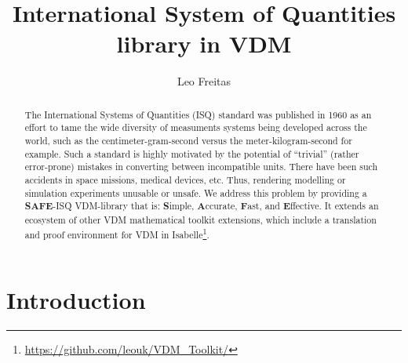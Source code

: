 \documentclass[runningheads,a4paper]{llncs}
\begin{document}
%



\title{International System of Quantities library in VDM}

\author{Leo Freitas
}
\authorrunning{ }

			
\maketitle
\setcounter{footnote}{0} 
\begin{abstract}
    The International Systems of Quantities (ISQ) standard was published in 1960 as an effort to tame the wide diversity of measuments systems being developed across the world, such as the centimeter-gram-second versus the meter-kilogram-second for example. Such a standard is highly motivated by the potential of ``trivial'' (rather error-prone) mistakes in converting between incompatible units. There have been such accidents in space missions, medical devices, etc. Thus, rendering modelling or simulation experiments unusable or unsafe. We address this problem by providing a \textbf{SAFE}-ISQ VDM-library that is: \textbf{S}imple, \textbf{A}ccurate, \textbf{F}ast, and \textbf{E}ffective. It extends an ecosystem of other VDM mathematical toolkit extensions, which include a translation and proof environment for VDM in Isabelle\footnote{\url{https://github.com/leouk/VDM_Toolkit/}}.
\end{abstract}


\section{Introduction}\label{sec:intro}
\end{document}
